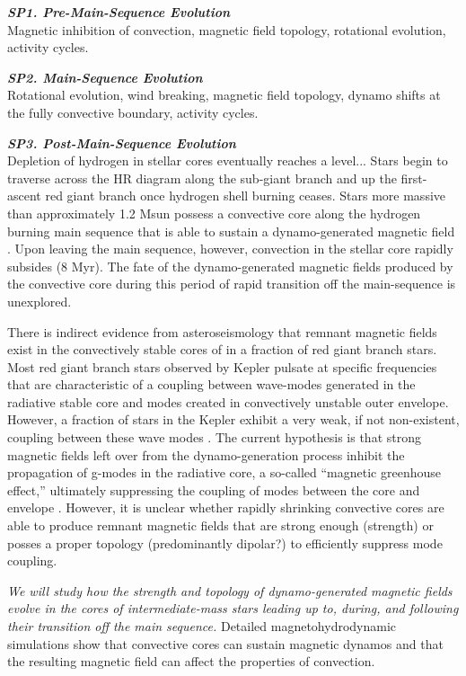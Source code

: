 \documentclass[12pt,a4paper]{article}
\begin{document}
\textbf{\textit{SP1. Pre-Main-Sequence Evolution}} \\
Magnetic inhibition of convection, magnetic field topology, rotational evolution, activity cycles.

\textbf{\textit{SP2. Main-Sequence Evolution}} \\
Rotational evolution, wind breaking, magnetic field topology, dynamo shifts at the fully convective boundary, activity cycles.

\textbf{\textit{SP3. Post-Main-Sequence Evolution}} \\
Depletion of hydrogen in stellar cores eventually reaches a level... Stars begin to traverse across the HR diagram along the sub-giant branch and up the first-ascent red giant branch once hydrogen shell burning ceases. Stars more massive than approximately 1.2 Msun possess a convective core along the hydrogen burning main sequence that is able to sustain a dynamo-generated magnetic field \citep[e.g.,][]{Browning2004,Featherstone2009,Augustson2016}. Upon leaving the main sequence, however, convection in the stellar core rapidly subsides (8 Myr). The fate of the dynamo-generated magnetic fields produced by the convective core during this period of rapid transition off the main-sequence is unexplored. 

There is indirect evidence from asteroseismology that remnant magnetic fields exist in the convectively stable cores of in a fraction of red giant branch stars. Most red giant branch stars observed by Kepler pulsate at specific frequencies that are characteristic of a coupling between wave-modes generated in the radiative stable core and modes created in convectively unstable outer envelope. However, a fraction of stars in the Kepler exhibit a very weak, if not non-existent, coupling between these wave modes \citep{Fuller2015}. The current hypothesis is that strong magnetic fields left over from the dynamo-generation process inhibit the propagation of g-modes in the radiative core, a so-called ``magnetic greenhouse effect,'' ultimately suppressing the coupling of modes between the core and envelope \citep{Fuller2015, Cantiello2016}. However, it is unclear whether rapidly shrinking convective cores are able to produce remnant magnetic fields that are strong enough (strength) or posses a proper topology (predominantly dipolar?) to efficiently suppress mode coupling. 

{\it We will study how the strength and topology of dynamo-generated magnetic fields evolve in the cores of intermediate-mass stars leading up to, during, and following their transition off the main sequence.} Detailed magnetohydrodynamic simulations show that convective cores can sustain magnetic dynamos and that the resulting magnetic field can affect the properties of convection.
\end{document}

